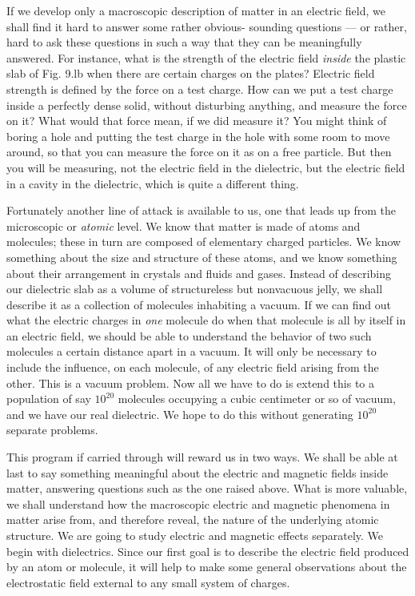 If we develop only a macroscopic description of matter in an
electric field, we shall find it hard to answer some rather obvious-
sounding questions --- or rather, hard to ask these questions in such
a way that they can be meaningfully answered. For instance, what
is the strength of the electric field \emph{inside} the plastic slab of Fig. 9.lb
when there are certain charges on the plates? Electric field strength
is defined by the force on a test charge. How can we put a test charge
inside a perfectly dense solid, without disturbing anything, and
measure the force on it? What would that force mean, if we did
measure it? You might think of boring a hole and putting the test
charge in the hole with some room to move around, so that you can
measure the force on it as on a free particle. But then you will be
measuring, not the electric field in the dielectric, but the electric field
in a cavity in the dielectric, which is quite a different thing.

Fortunately another line of attack is available to us, one that leads
up from the microscopic or \emph{atomic} level. We know that matter is
made of atoms and molecules; these in turn are composed of elementary
charged particles. We know something about the size and
structure of these atoms, and we know something about their arrangement
in crystals and fluids and gases. Instead of describing our
dielectric slab as a volume of structureless but nonvacuous jelly, we
shall describe it as a collection of molecules inhabiting a vacuum.
If we can find out what the electric charges in \emph{one} molecule do when
that molecule is all by itself in an electric field, we should be able to
understand the behavior of two such molecules a certain distance
apart in a vacuum. It will only be necessary to include the influence,
on each molecule, of any electric field arising from the other. This
is a vacuum problem. Now all we have to do is extend this to a population
of say $10^{20}$ molecules occupying a cubic centimeter or so of
vacuum, and we have our real dielectric. We hope to do this without
generating $10^{20}$ separate problems.

This program if carried through will reward us in two ways. We
shall be able at last to say something meaningful about the electric
and magnetic fields inside matter, answering questions such as the
one raised above. What is more valuable, we shall understand how
the macroscopic electric and magnetic phenomena in matter arise
from, and therefore reveal, the nature of the underlying atomic 
structure. We are going to study electric and magnetic effects separately.
We begin with dielectrics. Since our first goal is to describe the electric
field produced by an atom or molecule, it will help to make some
general observations about the electrostatic field external to any small
system of charges.

